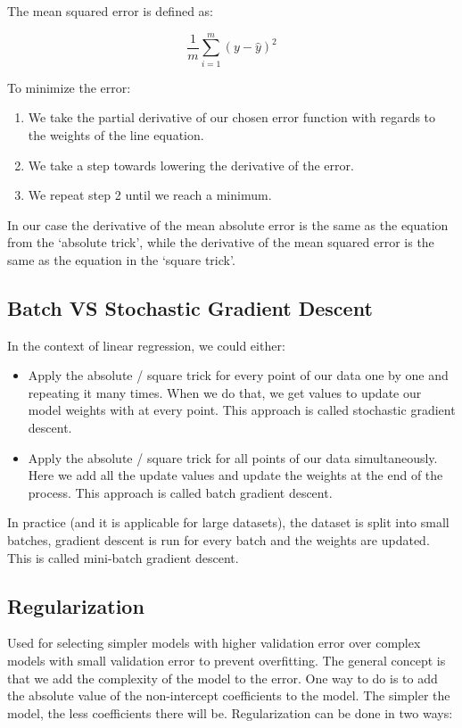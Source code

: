 \documentclass{article}
\begin{document}
The mean squared error is defined as:

\begin{equation}
  \frac{1}{m}\sum_{i = 1}^{m}(y - \hat{y})^2
\end{equation}

To minimize the error:

\begin{enumerate}
  \item We take the partial derivative of our chosen error function with regards to the weights of the line equation.
  \item We take a step towards lowering the derivative of the error.
  \item We repeat step 2 until we reach a minimum.
\end{enumerate}

In our case the derivative of the mean absolute error is the same as the equation from the ‘absolute trick’, while the derivative of the mean squared error is the same as the equation in the ‘square trick’.

\subsection{Batch VS Stochastic Gradient Descent}
In the context of linear regression, we could either:

\begin{itemize}
  \item Apply the absolute / square trick for every point of our data one by one and repeating it many times. When we do that, we get values to update our model weights with at every point. This approach is called stochastic gradient descent.
  \item Apply the absolute / square trick for all points of our data simultaneously. Here we add all the update values and update the weights at the end of the process. This approach is called batch gradient descent.
\end{itemize}

In practice (and it is applicable for large datasets), the dataset is split into small batches, gradient descent is run for every batch and the weights are updated. This is called mini-batch gradient descent.

\subsection{Regularization}
Used for selecting simpler models with higher validation error over complex models with small validation error to prevent overfitting. The general concept is that we add the complexity of the model to the error. One way to do is to add the absolute value of the non-intercept coefficients to the model. The simpler the model, the less coefficients there will be. Regularization can be done in two ways:
\end{document}
